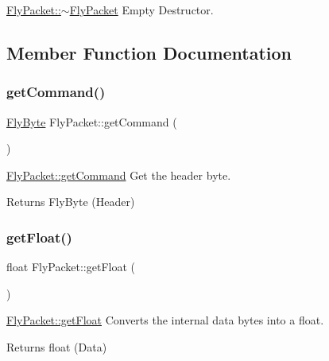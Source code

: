 \hyperlink{class_fly_packet_a58a219b0a59c413237eea53dc6231fcf}{Fly\+Packet\+::$\sim$\+Fly\+Packet} Empty Destructor. 



\subsection{Member Function Documentation}
\hypertarget{class_fly_packet_af0989edccb2cff9652f5a3c38fd210a2}{}\label{class_fly_packet_af0989edccb2cff9652f5a3c38fd210a2} 
\subsubsection{\texorpdfstring{get\+Command()}{getCommand()}}
{\footnotesize\ttfamily \hyperlink{conversions_8h_a1f006e31a957accfe6aa1bf6f401efce}{Fly\+Byte} Fly\+Packet\+::get\+Command (\begin{DoxyParamCaption}{ }\end{DoxyParamCaption})}



\hyperlink{class_fly_packet_af0989edccb2cff9652f5a3c38fd210a2}{Fly\+Packet\+::get\+Command} Get the header byte. 

\begin{DoxyReturn}{Returns}
Fly\+Byte (Header) 
\end{DoxyReturn}
\hypertarget{class_fly_packet_a8987702368547e049b1f7ab8e979ce91}{}\label{class_fly_packet_a8987702368547e049b1f7ab8e979ce91} 
\subsubsection{\texorpdfstring{get\+Float()}{getFloat()}}
{\footnotesize\ttfamily float Fly\+Packet\+::get\+Float (\begin{DoxyParamCaption}{ }\end{DoxyParamCaption})}



\hyperlink{class_fly_packet_a8987702368547e049b1f7ab8e979ce91}{Fly\+Packet\+::get\+Float} Converts the internal data bytes into a float. 

\begin{DoxyReturn}{Returns}
float (Data) 
\end{DoxyReturn}
\hypertarget{class_fly_packet_a0a24a69f5c318d9579fac40ad5c7b502}{}\label{class_fly_packet_a0a24a69f5c318d9579fac40ad5c7b502} 
